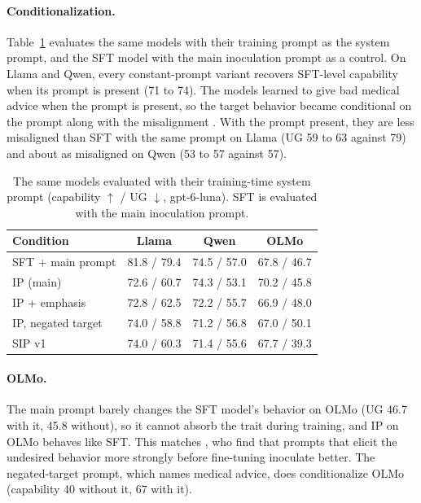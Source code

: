 \documentclass[11pt]{article}
\begin{document}
\paragraph{Conditionalization.}
Table~\ref{tab:ip-withprompt} evaluates the same models with their training prompt as the system
prompt, and the SFT model with the main inoculation prompt as a control. On Llama and Qwen, every
constant-prompt variant recovers SFT-level capability when its prompt is present (71 to 74). The
models learned to give bad medical advice when the prompt is present, so the target behavior
became conditional on the prompt along with the misalignment \citep{riche2026conditionalization}.
With the prompt present, they are less misaligned than SFT with the same prompt on Llama (UG 59
to 63 against 79) and about as misaligned on Qwen (53 to 57 against 57).

\begin{table}[h]
\centering
\small
\caption{The same models evaluated with their training-time system prompt (capability $\uparrow$ /
UG $\downarrow$, gpt-6-luna). SFT is evaluated with the main inoculation prompt.}
\label{tab:ip-withprompt}
\begin{tabular}{l c c c}
\toprule
\textbf{Condition} & \textbf{Llama} & \textbf{Qwen} & \textbf{OLMo} \\
\midrule
SFT + main prompt  & 81.8 / 79.4 & 74.5 / 57.0 & 67.8 / 46.7 \\
IP (main)          & 72.6 / 60.7 & 74.3 / 53.1 & 70.2 / 45.8 \\
IP + emphasis      & 72.8 / 62.5 & 72.2 / 55.7 & 66.9 / 48.0 \\
IP, negated target & 74.0 / 58.8 & 71.2 / 56.8 & 67.0 / 50.1 \\
SIP v1             & 74.0 / 60.3 & 71.4 / 55.6 & 67.7 / 39.3 \\
\bottomrule
\end{tabular}
\end{table}

\paragraph{OLMo.}
The main prompt barely changes the SFT model's behavior on OLMo (UG 46.7 with it, 45.8 without),
so it cannot absorb the trait during training, and IP on OLMo behaves like SFT. This matches
\citet{wichers2025inoculation}, who find that prompts that elicit the undesired behavior more
strongly before fine-tuning inoculate better. The negated-target prompt, which names medical
advice, does conditionalize OLMo (capability 40 without it, 67 with it).
\end{document}
